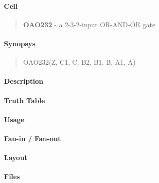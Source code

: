\label{OAO232}
\paragraph{Cell}
\begin{quote}
    \textbf{OAO232} - a 2-3-2-input OR-AND-OR gate
\end{quote}

\paragraph{Synopsys}
\begin{quote}
    OAO232(Z, C1, C, B2, B1, B, A1, A)
\end{quote}

\paragraph{Description}

%

\paragraph{Truth Table}
%

\paragraph{Usage}

\paragraph{Fan-in / Fan-out}

\paragraph{Layout}

\paragraph{Files}
